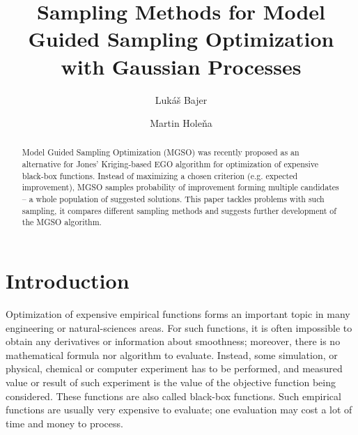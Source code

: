 \documentclass{itatnew}
\begin{document}
\title{Sampling Methods for Model Guided Sampling Optimization
  with Gaussian Processes}

\author{Lukáš Bajer \and Martin Holeňa}


\maketitle              %

\begin{abstract}
Model Guided Sampling Optimization (MGSO) was recently proposed as an alternative for Jones' Kriging-based EGO algorithm for optimization of expensive black-box functions. Instead of maximizing a chosen criterion (e.g. expected improvement), MGSO samples probability of improvement forming multiple candidates -- a whole population of suggested solutions. This paper tackles problems with such sampling, it compares different sampling methods and suggests further development of the MGSO algorithm.
\end{abstract}

\section{Introduction}
%
Optimization of expensive empirical functions forms an important topic in many engineering or natural-sciences areas. For such functions, it is often impossible to obtain any derivatives or information about smoothness; moreover, there is no mathematical formula nor algorithm to evaluate. Instead, some simulation, or physical, chemical or computer experiment has to be performed, and measured value or result of such experiment is the value of the objective function being considered. These functions are also called black-box functions. Such empirical functions are usually very expensive to evaluate; one evaluation may cost a lot of time and money to process.
\end{document}
